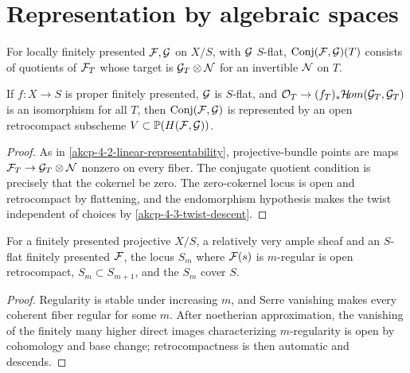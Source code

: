 \section{Representation by algebraic spaces}

\begin{definition}
\label{akcp-7-1-conjugate}
For locally finitely presented $\mathcal F,\mathcal G$ on $X/S$, with $\mathcal G$ $S$-flat,
$\operatorname{Conj}(\mathcal F,\mathcal G)(T)$ consists of quotients of $\mathcal F_T$ whose target is
$\mathcal G_T\otimes\mathcal N$ for an invertible $\mathcal N$ on $T$.
\end{definition}

\begin{theorem}
\label{akcp-7-2-conjugate-representability}
If $f:X\to S$ is proper finitely presented, $\mathcal G$ is $S$-flat, and
$\mathcal O_T\to(f_T)_*\mathcal H\!om(\mathcal G_T,\mathcal G_T)$ is an isomorphism for all $T$,
then $\operatorname{Conj}(\mathcal F,\mathcal G)$ is represented by an open retrocompact subscheme
$V\subset\mathbb P(H(\mathcal F,\mathcal G))$.
\end{theorem}
\begin{proof}
As in \cref{akcp-4-2-linear-representability}, projective-bundle points are
maps $\mathcal F_T\to\mathcal G_T\otimes\mathcal N$ nonzero on every fiber.  The conjugate quotient
condition is precisely that the cokernel be zero.  The zero-cokernel locus is
open and retrocompact by flattening, and the endomorphism hypothesis makes the
twist independent of choices by \cref{akcp-4-3-twist-descent}.
\end{proof}

\begin{lemma}
\label{akcp-7-3-regularity-strata}
For a finitely presented projective $X/S$, a relatively very ample sheaf and an
$S$-flat finitely presented $\mathcal F$, the locus $S_m$ where $\mathcal F(s)$ is
$m$-regular is open retrocompact, $S_m\subset S_{m+1}$, and the $S_m$ cover
$S$.
\end{lemma}
\begin{proof}
Regularity is stable under increasing $m$, and Serre vanishing makes every
coherent fiber regular for some $m$.  After noetherian approximation, the
vanishing of the finitely many higher direct images characterizing
$m$-regularity is open by cohomology and base change; retrocompactness is then
automatic and descends.
\end{proof}

